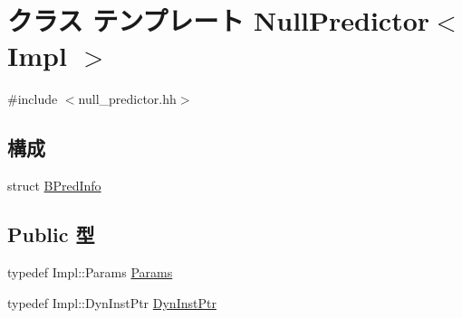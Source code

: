 \hypertarget{classNullPredictor}{
\section{クラス テンプレート NullPredictor$<$ Impl $>$}
\label{classNullPredictor}
}


{\ttfamily \#include $<$null\_\-predictor.hh$>$}\subsection*{構成}
\begin{DoxyCompactItemize}
\item 
struct \hyperlink{structNullPredictor_1_1BPredInfo}{BPredInfo}
\end{DoxyCompactItemize}
\subsection*{Public 型}
\begin{DoxyCompactItemize}
\item 
typedef Impl::Params \hyperlink{classNullPredictor_a818e103eae798a24a06a0a34631849ea}{Params}
\item 
typedef Impl::DynInstPtr \hyperlink{classNullPredictor_a028ce10889c5f6450239d9e9a7347976}{DynInstPtr}
\end{DoxyCompactItemize}
